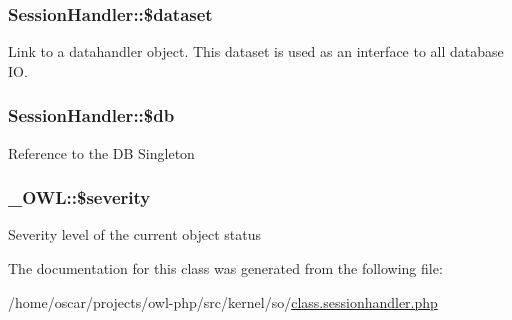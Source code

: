 \subsubsection[{\$dataset}]{\setlength{\rightskip}{0pt plus 5cm}SessionHandler::\$dataset}\label{classSessionHandler_a74c46fcfbadd4c4e6bacc73ddf350056}
Link to a datahandler object. This dataset is used as an interface to all database IO. 
\subsubsection[{\$db}]{\setlength{\rightskip}{0pt plus 5cm}SessionHandler::\$db}\label{classSessionHandler_a0bb7c3206f3664f2a4b8e96edf49a3bc}
Reference to the DB Singleton 
\subsubsection[{\$severity}]{\setlength{\rightskip}{0pt plus 5cm}\_\-OWL::\$severity}\label{class__OWL_ad26b40a9dbbacb33e299b17826f8327c}
Severity level of the current object status 

The documentation for this class was generated from the following file:\begin{DoxyCompactItemize}
\item 
/home/oscar/projects/owl-\/php/src/kernel/so/\hyperlink{class_8sessionhandler_8php}{class.sessionhandler.php}\end{DoxyCompactItemize}
